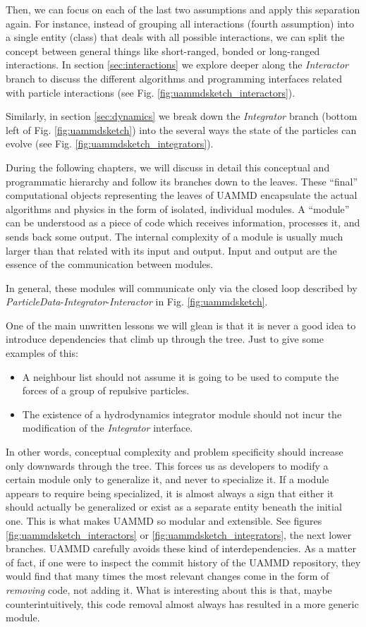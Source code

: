 \documentclass[twoside,openright,titlepage,numbers=noenddot,%
headinclude,footinclude,cleardoublepage=empty,abstract=on,
BCOR=5mm,fontsize=11pt, dvipsnames, paper=b5
]{scrreprt}
\newcommand{\uammd}{\gls{UAMMD}\xspace}
\begin{document}
Then, we can focus on each of the last two assumptions and apply this separation again. For instance, instead of grouping all interactions (fourth assumption) into a single entity (class) that deals with all possible interactions, we can split the concept between general things like short-ranged, bonded or long-ranged interactions. In section \ref{sec:interactions} we explore deeper along the \emph{Interactor} branch to discuss the different algorithms and programming interfaces related with particle interactions (see Fig. \ref{fig:uammdsketch_interactors}).

Similarly, in section \ref{sec:dynamics} we break down the \emph{Integrator} branch (bottom left of Fig. \ref{fig:uammdsketch}) into the several ways the state of the particles can evolve (see Fig. \ref{fig:uammdsketch_integrators}).

During the following chapters, we will discuss in detail this conceptual and programmatic hierarchy and follow its branches down to the leaves. These ``final'' computational objects representing the leaves of \uammd encapsulate the actual algorithms and physics in the form of isolated, individual modules. A ``module'' can be understood as a piece of code which receives information, processes it, and sends back some output. The internal complexity of a module is usually much larger than that related with its input and output. Input and output are the essence of the communication between modules.

In general, these modules will communicate only via the closed loop described by \emph{ParticleData}-\emph{Integrator}-\emph{Interactor} in Fig. \ref{fig:uammdsketch}.

One of the main unwritten lessons we will glean is that it is never a good idea to introduce dependencies that climb up through the tree. Just to give some examples of this:
\begin{itemize}
\item A neighbour list should not assume it is going to be used to
  compute the forces of a group of repulsive particles.
\item The existence
  of a hydrodynamics integrator module should not incur the
  modification of the \emph{Integrator} interface.
\end{itemize}
In other words, conceptual complexity and problem specificity should increase only downwards through the tree. This forces us as developers to modify a certain module only to generalize it, and never to specialize it. If a module appears to require being specialized, it is almost always a sign that either it should actually be generalized or exist as a separate entity beneath the initial one. This is what makes \uammd so modular and extensible. See figures \ref{fig:uammdsketch_interactors} or \ref{fig:uammdsketch_integrators}, the next lower branches.
\uammd carefully avoids these kind of interdependencies. As a matter of fact, if one were to inspect the commit history of the \uammd repository, they would find that many times the most relevant changes come in the form of \emph{removing} code, not adding it. What is interesting about this is that, maybe counterintuitively, this code removal almost always has resulted in a more generic module.
\end{document}
